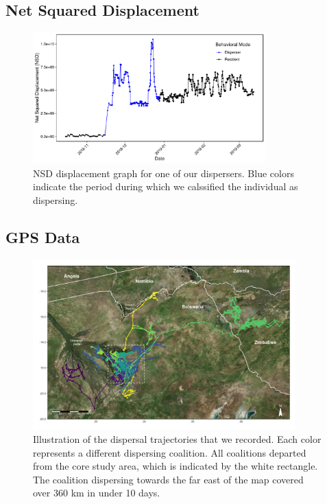 \documentclass[abstract=on,10pt,a4paper,bibliography=totocnumbered]{scrartcl}
\begin{document}
\subsection{Net Squared Displacement}
\label{Appendix:GPSData}

\begin{figure}[h]
  \begin{center}
    \includegraphics[width = 0.8\textwidth]{99_NSD.pdf}
    \caption{NSD displacement graph for one of our dispersers. Blue colors
    indicate the period during which we calssified the individual as
    dispersing.}
    \label{NSD}
  \end{center}
\end{figure}

\newpage
\subsection{GPS Data}
\label{Appendix:GPSData}

\begin{figure}[h]
  \begin{center}
    \includegraphics[width = 0.9\textwidth]{99_Trajectories.pdf}
    \caption{Illustration of the dispersal trajectories that we recorded. Each
    color represents a different dispersing coalition. All coalitions departed
    from the core study area, which is indicated by the white rectangle. The
    coalition dispersing towards the far east of the map covered over 360 km in
    under 10 days.}
    \label{Trajectories}
  \end{center}
\end{figure}
\end{document}
